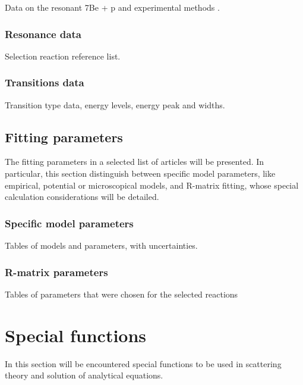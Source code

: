 \documentclass[openany]{book}
\begin{document}
Data on the resonant 7Be + p and experimental methods \cite{buompane_dileva_gialanella_d'onofrio_decesare_duarte_fulop_gasques_gyurky_morales-gallegos_et_2022}.

\subsection{Resonance data}  \label{sub:ResonanceData}

Selection reaction reference list.

\subsection{Transitions data} \label{sub:Transitions2Data}

Transition type data, energy levels, energy peak and widths.

\section{Fitting parameters} \label{sec:fittingParams}

The fitting parameters in a selected list of articles will be presented. In particular, this section distinguish between specific model parameters, like empirical, potential or microscopical models, and R-matrix fitting, whose special calculation considerations will be detailed.

\subsection{Specific model parameters} \label{sub:modelParameters}

Tables of models and parameters, with uncertainties. 

\subsection{R-matrix parameters} \label{sub:rmatrixParameters}

Tables of parameters that were chosen for the selected reactions

\chapter{Special functions} \label{ap:specialFunctions}

In this section will be encountered special functions to be used in scattering theory and solution of analytical equations.
\end{document}

